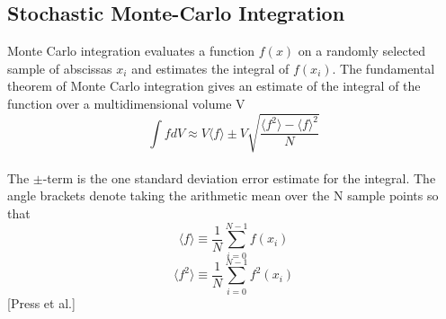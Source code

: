 \documentclass[%
reprint,
amsmath,amssymb,
aps,
]{revtex4-1}
\begin{document}
\subsection*{Stochastic Monte-Carlo Integration}\noindent 
Monte Carlo integration evaluates a function $f(x)$ on a randomly selected sample of abscissas $x_i$ and estimates the integral of $f(x_i)$. The fundamental theorem of Monte Carlo integration gives an estimate of the integral of the function over a multidimensional volume V\vspace{2mm} \\
\begin{equation}
	\int f dV \approx V \langle f\rangle \pm V\sqrt{\dfrac{ \langle f^2 \rangle - \langle f \rangle^2}{N}}
\end{equation}\vspace{2mm} \\
The $\pm$-term is the one standard deviation error estimate for the integral. The angle brackets denote taking the arithmetic mean over the N sample points so that \vspace{2mm} \\
\begin{equation*}
	\langle f \rangle \equiv \dfrac{1}{N}\sum_{i=0}^{N-1}f(x_i)
\end{equation*}
\begin{equation*}
\langle f^2 \rangle \equiv \dfrac{1}{N}\sum_{i=0}^{N-1}f^2(x_i)
\end{equation*}\vspace{2mm} 
\hspace{65mm}[Press et al.]
\end{document}
